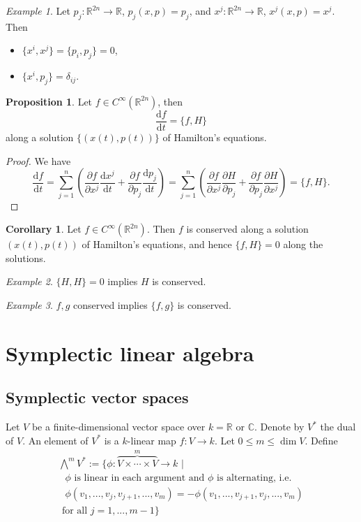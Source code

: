 \documentclass[12pt]{amsart}
\numberwithin{equation}{section}
\theoremstyle{plain}
\theoremstyle{definition}
\newtheorem{prop}{Proposition}[subsection]
\newtheorem{cor}{Corollary}[subsection]
\theoremstyle{remark}
\newtheorem{ex}{Example}[subsection]
\newcommand{\R}{\mathbb{R}}
\newcommand{\dd}{{\mathrm{d}}}
\begin{document}
\begin{ex}
Let $p_j\colon \R^{2n}\to \R$, $p_j(x,p)=p_j$, and $x^j\colon \R^{2n}\to \R$, $x^j(x,p)=x^j$. Then 
\begin{itemize}
\item{$\{x^{i},x^j\}=\{p_i,p_j\}=0$,
}
\item{$\{x^{i},p_j\}=\delta_{ij}$.}
\end{itemize}
\end{ex}

\begin{prop}
Let $f\in C^\infty(\R^{2n})$, then $$\frac{\dd f}{\dd t}=\{f,H\}$$ along a solution $\{(x(t),p(t))\}$ of Hamilton's equations.
\end{prop}

\begin{proof} We have
$$\frac{\dd f}{\dd t}=\sum_{j=1}^n\left(\frac{\partial f}{\partial x^j}\frac{\dd x^j}{\dd t}+\frac{\partial f}{\partial p_j}\frac{\dd p_j}{\dd t}\right)=\sum_{j=1}^n\left(\frac{\partial f}{\partial x^j}\frac{\partial H}{\partial p_j}+\frac{\partial f}{\partial p_j}\frac{\partial H}{\partial x^j}\right)=\{f,H\}.$$
\end{proof}


\begin{cor}
Let $f\in C^\infty(\R^{2n})$. Then $f$ is conserved along a solution $(x(t),p(t))$ of Hamilton's equations, and hence $\{f,H\}=0$ along the solutions.
\end{cor}

\begin{ex}
$\{H,H\}=0$ implies $H$ is conserved.
\end{ex}
\begin{ex}
$f,g$ conserved implies $\{f,g\}$ is conserved.
\end{ex}

\section{Symplectic linear algebra}

\subsection{Symplectic vector spaces} Let $V$ be a finite-dimensional vector space over $k=\R$ or $\mathbb{C}$. Denote by $V^*$ the dual of $V$. An element of $V^*$ is a $k$-linear map $f\colon V\to k$. Let $0\leq m\leq \dim V$. Define 
\begin{multline*}
\bigwedge^mV^*:=\Big\{\phi\colon \overbrace{V\times\dotsm \times V}^{m}\to k\,\,\big|\,\, \\ \text{ $\phi$ is linear in each argument and $\phi$ is alternating,  i.e. }\\
\text{ $\phi(v_1,...,v_j,v_{j+1},...,v_m)=-\phi(v_1,...,v_{j+1},v_j,...,v_m)$}\\
\text{ for all $j=1,...,m-1$}\Big\}
\end{multline*}
\end{document}
